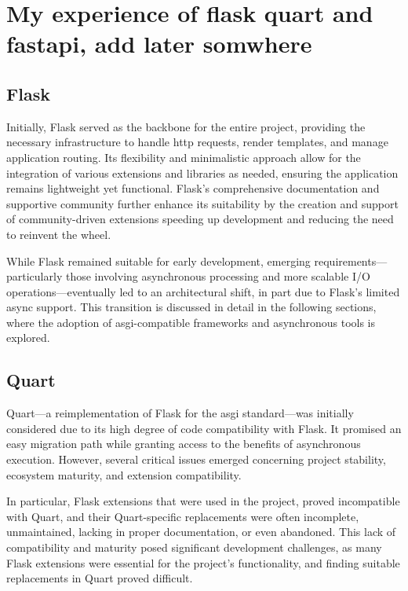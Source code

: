 \section{My experience of flask quart and fastapi, add later somwhere}
  \subsection{Flask}

    Initially, Flask served as the backbone for the entire project, providing the necessary infrastructure to handle \ac{http} 
    requests, render templates, and manage application routing. Its flexibility and minimalistic approach allow for the 
    integration of various extensions and libraries as needed, ensuring the application remains lightweight yet functional. 
    Flask's comprehensive documentation and supportive community further enhance its suitability by the creation and support
    of community-driven extensions speeding up development and reducing the need to reinvent the wheel.

    While Flask remained suitable for early development, emerging requirements—particularly those involving asynchronous 
    processing and more scalable I/O operations—eventually led to an architectural shift, in part due to Flask's limited async 
    support. This transition is discussed in detail in the following sections, where the adoption of \ac{asgi}-compatible 
    frameworks and asynchronous tools is explored.

  \subsection{Quart}

    Quart—a reimplementation of Flask for the \ac{asgi} standard—was initially considered due to its high degree of 
    code compatibility with Flask. It promised an easy migration path while granting access to the benefits of asynchronous 
    execution. However, several critical issues emerged concerning project stability, ecosystem maturity, and extension 
    compatibility.

    In particular, Flask extensions that were used in the project, proved incompatible with Quart, and their Quart-specific 
    replacements  were often incomplete,  unmaintained, lacking in proper documentation, or even abandoned.
    This lack of compatibility and maturity posed significant development challenges, as many Flask extensions were essential
    for the project's functionality, and finding suitable replacements in Quart proved difficult.


